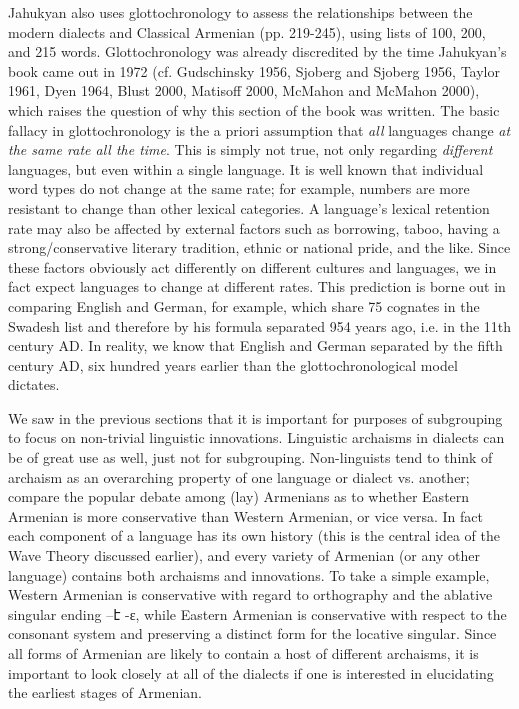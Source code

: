 Jahukyan also uses glottochronology to assess the relationships between the modern dialects and Classical Armenian (pp. 219-245), using lists of 100, 200, and 215 words. Glottochronology was already discredited by the time Jahukyan’s book came out in 1972 (cf. Gudschinsky 1956, Sjoberg and Sjoberg 1956, Taylor 1961, Dyen 1964, Blust 2000, Matisoff 2000, McMahon and McMahon 2000), which raises the question of why this section of the book was written. The basic fallacy in glottochronology is the a priori assumption that \textit{all} languages change \textit{at the same rate all the time}. This is simply not true, not only regarding \textit{different} languages, but even within a single language. It is well known that individual word types do not change at the same rate; for example, numbers are more resistant to change than other lexical categories. A language’s lexical retention rate may also be affected by external factors such as borrowing, taboo, having a strong/conservative literary tradition, ethnic or national pride, and the like. Since these factors obviously act differently on different cultures and languages, we in fact expect languages to change at different rates. This prediction is borne out in comparing English and German, for example, which share 75 cognates in the Swadesh list and therefore by his formula separated 954 years ago, i.e. in the 11th century AD. In reality, we know that English and German separated by the fifth century AD, six hundred years earlier than the glottochronological model dictates. 

We saw in the previous sections that it is important for purposes of subgrouping to focus on non-trivial linguistic innovations. Linguistic archaisms in dialects can be of great use as well, just not for subgrouping. Non-linguists tend to think of archaism as an overarching property of one language or dialect vs. another; compare the popular debate among (lay) Armenians as to whether Eastern Armenian is more conservative than Western Armenian, or vice versa. In fact each component of a language has its own history (this is the central idea of the Wave Theory discussed earlier), and every variety of Armenian (or any other language) contains both archaisms and innovations. To take a simple example, Western Armenian is conservative with regard to orthography and the ablative singular ending –է -ɛ, while Eastern Armenian is conservative with respect to the consonant system and preserving a distinct form for the locative singular. Since all forms of Armenian are likely to contain a host of different archaisms, it is important to look closely at all of the dialects if one is interested in elucidating the earliest stages of Armenian.

